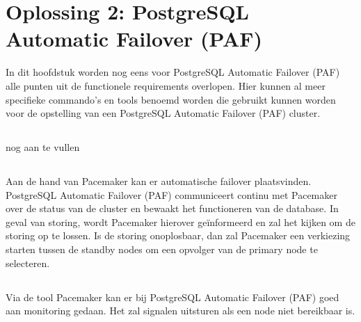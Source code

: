 
\chapter{Oplossing 2: PostgreSQL Automatic Failover (PAF)}
\label{ch:Oplossing 2: PostgreSQL Automatic Failover}



In dit hoofdstuk worden nog eens voor PostgreSQL Automatic Failover (PAF) alle punten uit de functionele requirements overlopen. Hier kunnen al meer specifieke commando's en tools benoemd worden die gebruikt kunnen worden voor de opstelling van een PostgreSQL Automatic Failover (PAF) cluster.


\section{}
\label{sec:Redundantie/Replicatie}

nog aan te vullen

\section{}
\label{sec:Failover}

Aan de hand van Pacemaker kan er automatische failover plaatsvinden. PostgreSQL Automatic Failover (PAF) communiceert continu met Pacemaker over de status van de cluster en bewaakt het functioneren van de database. In geval van storing, wordt Pacemaker hierover geïnformeerd en zal het kijken om de storing op te lossen. Is de storing onoplosbaar, dan zal Pacemaker een verkiezing starten tussen de standby nodes om een opvolger van de primary node te selecteren.

\section{}
\label{sec:Monitoring}

Via de tool Pacemaker kan er bij PostgreSQL Automatic Failover (PAF) goed aan monitoring gedaan. Het zal signalen uitsturen als een node niet bereikbaar is.